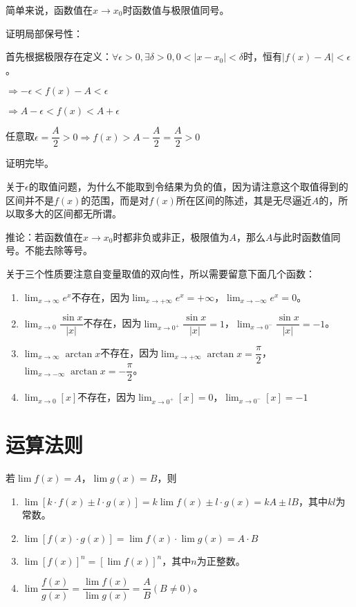 \documentclass[UTF8]{ctexart}
\begin{document}
简单来说，函数值在$x\to x_0$时函数值与极限值同号。

证明局部保号性：

首先根据极限存在定义：$\forall\epsilon>0,\exists\delta>0,0<\vert x-x_0\vert<\delta$时，恒有$\vert f(x)-A\vert<\epsilon$。

$\Rightarrow -\epsilon<f(x)-A<\epsilon$

$\Rightarrow A-\epsilon<f(x)<A+\epsilon$

任意取$\epsilon=\dfrac{A}{2}>0\Rightarrow f(x)>A-\dfrac{A}{2}=\dfrac{A}{2}>0$

证明完毕。

关于$\epsilon$的取值问题，为什么不能取到令结果为负的值，因为请注意这个取值得到的区间并不是$f(x)$的范围，而是对$f(x)$所在区间的陈述，其是无尽逼近$A$的，所以取多大的区间都无所谓。

推论：若函数值在$x\to x_0$时都非负或非正，极限值为$A$，那么$A$与此时函数值同号。不能去除等号。

\bigskip

关于三个性质要注意自变量取值的双向性，所以需要留意下面几个函数：

\begin{enumerate}
    \item $\lim_{x\to\infty}e^x$不存在，因为$\lim_{x\to +\infty}e^x=+\infty$，$\lim_{x\to -\infty}e^x=0$。
    \item $\lim_{x\to 0}\dfrac{\sin x}{\vert x\vert}$不存在，因为$\lim_{x\to 0^+}\dfrac{\sin x}{\vert x\vert}=1$，$\lim_{x\to 0^-}\dfrac{\sin x}{\vert x\vert}=-1$。
    \item $\lim_{x\to\infty}\arctan x$不存在，因为$\lim_{x\to +\infty}\arctan x=\dfrac{\pi}{2}$，$\lim_{x\to -\infty}\arctan x=-\dfrac{\pi}{2}$。
    \item $\lim_{x\to 0}[x]$不存在，因为$\lim_{x\to 0^+}[x]=0$，$\lim_{x\to 0^-}[x]=-1$
\end{enumerate}

\section{运算法则}

若$\lim f(x)=A$，$\lim g(x)=B$，则

\begin{enumerate}
    \item $\lim[k\cdot f(x)\pm l\cdot g(x)]=k\lim f(x)\pm l\cdot g(x)=kA\pm lB$，其中$kl$为常数。
    \item $\lim[f(x)\cdot g(x)]=\lim f(x)\cdot\lim g(x)=A\cdot B$
    \item $\lim[f(x)]^n=[\lim f(x)]^n$，其中$n$为正整数。
    \item $\lim\dfrac{f(x)}{g(x)}=\dfrac{\lim f(x)}{\lim g(x)}=\dfrac{A}{B}(B\neq 0)$。
\end{enumerate}
\end{document}
